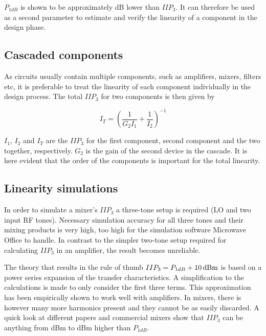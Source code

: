 			$P_{1dB}$ is shown to be approximately \unit[10]{dB} lower than $IIP_3$.\autocite{kundert02} It can therefore be used as a second parameter to estimate and verify the linearity of a component in the design phase. %

		\subsection{Cascaded components}\label{sec:casc_iip3}
			As circuits usually contain multiple components, such as amplifiers, mixers, filters etc, it is preferable to treat the linearity of each component individually in the design process. The total $IIP_3$ for two components is then given by \autocite{pozar90}

			\begin{equation}\label{eq:casciip3}
				I_T=\left ( \frac{1}{G_2I_1} + \frac{1}{I_2} \right )^{-1}
			\end{equation}

			$I_1$, $I_2$ and $I_T$ are the $IIP_3$ for the first component, second component and the two together, respectively. $G_2$ is the gain of the second device in the cascade. It is here evident that the order of the components is important for the total linearity.

		\subsection{Linearity simulations}
			In order to simulate a mixer's $IIP_3$ a three-tone setup is required (LO and two input RF tones). Necessary simulation accuracy for all three tones and their mixing products is very high, too high for the simulation software Microwave Office to handle. In contrast to the simpler two-tone setup required for calculating $IIP_3$ in an amplifier, the result becomes unreliable.

			The theory that results in the rule of thumb $IIP_3=P_{1dB}+\unit[10]{dBm}$ is based on a power series expansion of the transfer characteristics. A simplification to the calculations is made to only consider the first three terms. This approximation has been empirically shown to work well with amplifiers. In mixers, there is however many more harmonics present and they cannot be as easily discarded. A quick look at different papers and commercial mixers show that $IIP_3$ can be anything from \unit[6]{dBm} to \unit[14]{dBm} higher than $P_{1dB}$.


